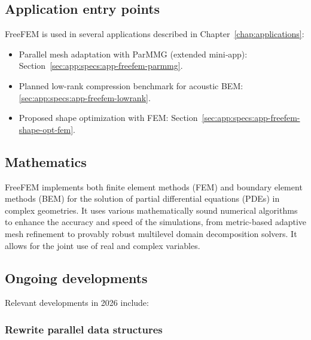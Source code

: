 \subsection{Application entry points}
\label{sec:Freefem++:apps}
FreeFEM is used in several applications described in Chapter~\ref{chap:applications}:
\begin{itemize}
        \item Parallel mesh adaptation with ParMMG (extended mini‑app): Section~\ref{sec:app:specs:app-freefem-parmmg}.
        \item Planned low-rank compression benchmark for acoustic BEM: \cref{sec:app:specs:app-freefem-lowrank}.
        \item Proposed shape optimization with FEM: Section~\ref{sec:app:specs:app-freefem-shape-opt-fem}.
\end{itemize}



\subsection{Mathematics}
\label{sec:Freefem++:mathematics}

FreeFEM implements both finite element methods (FEM) and boundary element methods (BEM) for the solution of partial differential equations (PDEs) in complex geometries. It uses various mathematically sound numerical algorithms to enhance the accuracy and speed of the simulations, from metric-based adaptive mesh refinement to provably robust multilevel domain decomposition solvers. It allows for the joint use of real and complex variables.

\subsection{Ongoing developments}
\label{sec:Freefem++:implementation-2026}

Relevant developments in 2026 include:

\subsubsection{Rewrite parallel data structures}
\label{sec:Freefem++:implementation-2026:distrib}


